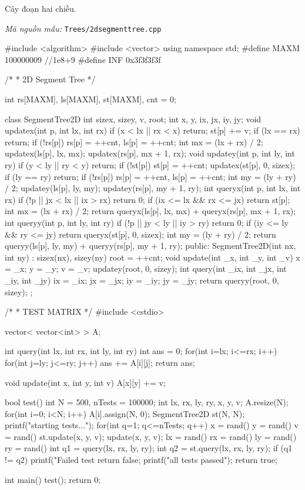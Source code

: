 \documentclass[11pt]{article}
\newcommand{\codepath}[1]{\par\noindent\textit{Mã nguồn mẫu:} \texttt{#1}\par}
\begin{document}
Cây đoạn hai chiều.

\codepath{Trees/2dsegmenttree.cpp}

\begingroup\scriptsize
\begin{vncode}
#include <algorithm>
#include <vector>
using namespace std;
#define MAXM 100000009 //1e8+9
#define INF 0x3f3f3f3f

/*
 * 2D Segment Tree
 */

int rs[MAXM], ls[MAXM], st[MAXM], cnt = 0;

class SegmentTree2D {
	int sizex, sizey, v, root;
	int x, y, ix, jx, iy, jy;
	void updatex(int p, int lx, int rx) {
		if (x < lx || rx < x) return;
		st[p] += v;
		if (lx == rx) return;
		if (!rs[p]) rs[p] = ++cnt, ls[p] = ++cnt;
		int mx = (lx + rx) / 2;
		updatex(ls[p], lx, mx);
		updatex(rs[p], mx + 1, rx);
	}
	void updatey(int p, int ly, int ry) {
		if (y < ly || ry < y) return;
		if (!st[p]) st[p] = ++cnt;
		updatex(st[p], 0, sizex);
		if (ly == ry) return;
		if (!rs[p]) rs[p] = ++cnt, ls[p] = ++cnt;
		int my = (ly + ry) / 2;
		updatey(ls[p], ly, my);
		updatey(rs[p], my + 1, ry);
	}
	int queryx(int p, int lx, int rx) {
		if (!p || jx < lx || ix > rx) return 0;
		if (ix <= lx && rx <= jx) return st[p];
		int mx = (lx + rx) / 2;
		return queryx(ls[p], lx, mx) +
			queryx(rs[p], mx + 1, rx);
	}
	int queryy(int p, int ly, int ry) {
		if (!p || jy < ly || iy > ry) return 0;
		if (iy <= ly && ry <= jy) return queryx(st[p], 0, sizex);
		int my = (ly + ry) / 2;
		return queryy(ls[p], ly, my) +
			queryy(rs[p], my + 1, ry);
	}
public:
	SegmentTree2D(int nx, int ny) : sizex(nx), sizey(ny) {
		root = ++cnt;
	}
	void update(int _x, int _y, int _v) {
		x = _x; y = _y; v = _v;
		updatey(root, 0, sizey);
	}
	int query(int _ix, int _jx, int _iy, int _jy) {
		ix = _ix; jx = _jx; iy = _iy; jy = _jy;
		return queryy(root, 0, sizey);
	}
};

/*
 *	TEST MATRIX
 */
#include <cstdio>

vector< vector<int> > A;

int query(int lx, int rx, int ly, int ry) {
	int ans = 0;
	for(int i=lx; i<=rx; i++) {
		for(int j=ly; j<=ry; j++) {
			ans += A[i][j];
		}
	}
	return ans;
}

void update(int x, int y, int v) {
	A[x][y] += v;
}

bool test() {
	int N = 500, nTests = 100000;
	int lx, rx, ly, ry, x, y, v;
	A.resize(N);
	for(int i=0; i<N; i++) {
		A[i].assign(N, 0);
	}
	SegmentTree2D st(N, N);
	printf("starting tests...\n");
	for(int q=1; q<=nTests; q++) {
		x = rand()%
		y = rand()%
		v = rand()%
		st.update(x, y, v);
		update(x, y, v);
		lx = rand()%
		rx = rand()%
		ly = rand()%
		ry = rand()%
		int q1 = query(lx, rx, ly, ry);
		int q2 = st.query(lx, rx, ly, ry);
		if (q1 != q2) {
			printf("Failed test %
			return false;
		}
	}
	printf("all tests passed\n");
	return true;
}

int main() {
	test();
	return 0;
}
\end{vncode}
\endgroup
\end{document}
